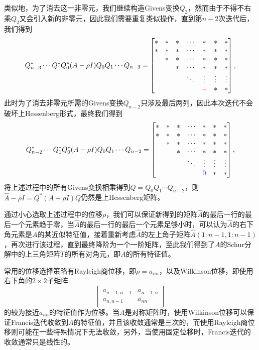 \documentclass[a4paper,10pt]{ctexart}
\begin{document}
类似地，为了消去这一非零元，我们继续构造Givens变换$ Q_2 $，然而由于不得不右乘$ Q_2 $又会引入新的非零元，因此我们需要重复类似操作，直到第$ n-2 $次迭代后，我们得到
\[
    Q_{n-3}^*\cdots Q_1^*Q_0^*(A-\rho I)Q_0Q_1\cdots Q_{n-3} = 
    \begin{bmatrix} 
        * & * & * & \cdots & * & * & * \\
        * & * & * & \cdots & * & * & *\\
         & * & * & \cdots & * & * & *\\
          &   & * & \cdots & * & * & *\\
            &   &   & \ddots & \vdots & \vdots & \vdots\\
            &   &   &        & \textcolor{red}{+} & *& *
    \end{bmatrix},
\]
此时为了消去非零元所需的Givens变换$ Q_{n-2} $只涉及最后两列，因此本次迭代不会破坏上Hessenberg形式，最终我们得到
\[
    Q_{n-2}^*\cdots Q_1^*Q_0^*(A-\rho I)Q_0Q_1\cdots Q_{n-2} = 
    \begin{bmatrix} 
        * & * & * & \cdots & * & * & * \\
        * & * & * & \cdots & * & * & *\\
         & * & * & \cdots & * & * & *\\
          &   & * & \cdots & * & * & *\\
            &   &   & \ddots & \vdots & \vdots & \vdots\\
            &   &   &        & \textcolor{blue}{0} & * & *
    \end{bmatrix},
\]
将上述过程中的所有Givens变换相乘得到$ Q = Q_0Q_1\cdots Q_{n-2} $，则$ \hat{A}-\rho I = Q^*(A-\rho I)Q $仍然是上Hessenberg矩阵。

通过小心选取上述过程中的位移$ \rho $，我们可以保证新得到的矩阵$ \hat{A} $的最后一行的最后一个元素趋于零，当$ \hat{A} $的最后一行的最后一个元素足够小时，可以认为$ \hat{A} $的右下角元素是$ A $的某近似特征值，接着重新考虑$ \hat{A} $的左上角子矩阵$ \hat{A}(1:n-1,1:n-1) $，再次进行该过程，直到最终降阶为一个一阶矩阵，至此我们得到了$ A $的Schur分解中的上三角矩阵$ T $的所有对角元，即$ A $的所有特征值。

常用的位移选择策略有Rayleigh商位移，即$ \rho = a_{nn} $，以及Wilkinson位移，即使用右下角的$ 2\times 2 $子矩阵
\[
    \begin{bmatrix} 
        a_{n-1,n-1} & a_{n-1,n} \\
        a_{n,n-1} & a_{nn}
    \end{bmatrix}
\]
的较为接近$ a_{nn} $的特征值作为位移。当$ A $是对称矩阵时，使用Wilkinson位移可以保证Francis迭代收敛到$ A $的特征值，并且该收敛通常是三次的，而使用Rayleigh商位移则可能在一些特殊情况下无法收敛，另外，当使用固定位移时，Francis迭代的收敛通常只是线性的。
\end{document}
